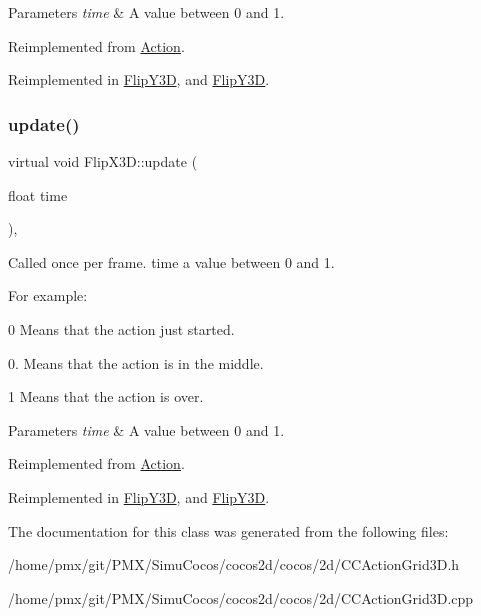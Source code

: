 \begin{DoxyParams}{Parameters}
{\em time} & A value between 0 and 1. \\
\hline
\end{DoxyParams}


Reimplemented from \hyperlink{classAction_a937e646e63915e33ad05ba149bfcf239}{Action}.



Reimplemented in \hyperlink{classFlipY3D_a19706da07e07cdad9cf19509a2bb0bff}{Flip\+Y3D}, and \hyperlink{classFlipY3D_ad3c0474d05070c8defea64cc4d47d8b6}{Flip\+Y3D}.

\mbox{\label{classFlipX3D_adda76f1ed938e8df6761d784e23753e0}} 
\subsubsection{\texorpdfstring{update()}{update()}\hspace{0.1cm}{\footnotesize\ttfamily [2/2]}}
{\footnotesize\ttfamily virtual void Flip\+X3\+D\+::update (\begin{DoxyParamCaption}\item[{float}]{time }\end{DoxyParamCaption})\hspace{0.3cm}{\ttfamily [override]}, {\ttfamily [virtual]}}

Called once per frame. time a value between 0 and 1.

For example\+:
\begin{DoxyItemize}
\item 0 Means that the action just started.
\item 0. Means that the action is in the middle.
\item 1 Means that the action is over.
\end{DoxyItemize}


\begin{DoxyParams}{Parameters}
{\em time} & A value between 0 and 1. \\
\hline
\end{DoxyParams}


Reimplemented from \hyperlink{classAction_a937e646e63915e33ad05ba149bfcf239}{Action}.



Reimplemented in \hyperlink{classFlipY3D_a19706da07e07cdad9cf19509a2bb0bff}{Flip\+Y3D}, and \hyperlink{classFlipY3D_ad3c0474d05070c8defea64cc4d47d8b6}{Flip\+Y3D}.



The documentation for this class was generated from the following files\+:\begin{DoxyCompactItemize}
\item 
/home/pmx/git/\+P\+M\+X/\+Simu\+Cocos/cocos2d/cocos/2d/C\+C\+Action\+Grid3\+D.\+h\item 
/home/pmx/git/\+P\+M\+X/\+Simu\+Cocos/cocos2d/cocos/2d/C\+C\+Action\+Grid3\+D.\+cpp\end{DoxyCompactItemize}
